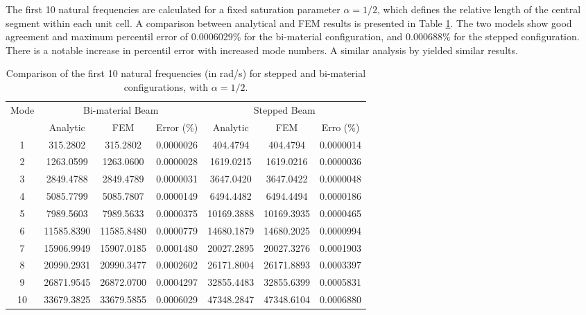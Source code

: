 
The first 10 natural frequencies are calculated for a fixed saturation parameter $\alpha=1/2$, which defines the relative length of the central segment within each unit cell. A comparison between analytical and FEM results is presented in Table \ref{tab:sim1}. The two models show good agreement and maximum percentil error of 0.0006029\% for the bi-material configuration, and 0.000688\% for the stepped configuration. There is a notable increase in percentil error with increased mode numbers. A similar analysis by \textcite{Domagalski2021} yielded similar results.
\begin{table}[htbp]
\centering
\caption{Comparison of the first 10 natural frequencies (in rad/s) for stepped and bi-material configurations, with $\alpha=1/2$.}
\label{tab:freq_validation}
\begin{tabular}{c ccc ccc}
\toprule
\multirow{2}{*}{Mode} & \multicolumn{3}{c}{Bi-material Beam} & \multicolumn{3}{c}{Stepped Beam} \\
\cmidrule(lr){2-4} \cmidrule(lr){5-7}
 & Analytic & FEM & Error (\%) & Analytic & FEM & Erro (\%) \\
\midrule
1 & 315.2802 & 315.2802 & 0.0000026 & 404.4794 & 404.4794 & 0.0000014 \\
2 & 1263.0599 & 1263.0600 & 0.0000028 & 1619.0215 & 1619.0216 & 0.0000036 \\
3 & 2849.4788 & 2849.4789 & 0.0000031 & 3647.0420 & 3647.0422 & 0.0000048 \\
4 & 5085.7799 & 5085.7807 & 0.0000149 & 6494.4482 & 6494.4494 & 0.0000186 \\
5 & 7989.5603 & 7989.5633 & 0.0000375 & 10169.3888 & 10169.3935 & 0.0000465 \\
6 & 11585.8390 & 11585.8480 & 0.0000779 & 14680.1879 & 14680.2025 & 0.0000994 \\
7 & 15906.9949 & 15907.0185 & 0.0001480 & 20027.2895 & 20027.3276 & 0.0001903 \\
8 & 20990.2931 & 20990.3477 & 0.0002602 & 26171.8004 & 26171.8893 & 0.0003397 \\
9 & 26871.9545 & 26872.0700 & 0.0004297 & 32855.4483 & 32855.6399 & 0.0005831 \\
10 & 33679.3825 & 33679.5855 & 0.0006029 & 47348.2847 & 47348.6104 & 0.0006880 \\
\bottomrule
\end{tabular}
\label{tab:sim1} 
\end{table}

